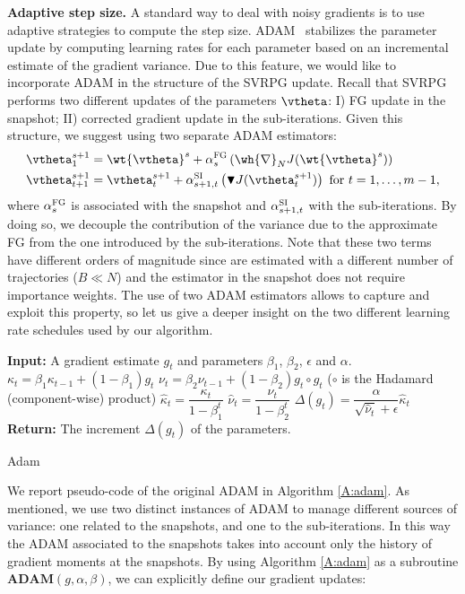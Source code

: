\textbf{Adaptive step size.}
A standard way to deal with noisy gradients is to use adaptive strategies to compute the step size.
 \ac{ADAM}~\citep{kingma2014adam} stabilizes the parameter update by computing learning rates for each parameter based on an incremental estimate of the gradient variance.
Due to this feature, we would like to incorporate \acs{ADAM} in the structure of the \acs{SVRPG} update.
Recall that \acs{SVRPG} performs two different updates of the parameters $\vtheta$: I) \acs{FG} update in the snapshot; II) corrected gradient update in the sub-iterations.
Given this structure, we suggest using two separate \acs{ADAM} estimators:
\begin{align*}
\vtheta^{s+1}_1 &= \wt{\vtheta}^s + \alpha^{\textsc{FG}}_s\left(\wh{\nabla}_N J(\wt{\vtheta}^s) \right)\\
\vtheta^{s+1}_{t+1} &= \vtheta^{s+1}_t + \alpha^{\textsc{SI}}_{s+1,t}\left( 
\blacktriangledown J(\vtheta^{s+1}_t)\right)
\text{ for $t=1,\dots,m-1$},
\end{align*}
where $\alpha^{\textsc{FG}}_{s}$ is associated with the snapshot and $\alpha^{\textsc{SI}}_{s+1,t}$ with the sub-iterations.
By doing so, we decouple the contribution of the variance due to the approximate \acs{FG} from the one introduced by the sub-iterations.
Note that these two terms have different orders of magnitude since are estimated with a different number of trajectories ($B \ll N$) and the estimator in the snapshot does not require importance weights.
The use of two \acs{ADAM} estimators allows to capture and exploit this property, so let us give a deeper insight on the two different learning rate schedules used by our algorithm.\newline
\begin{algorithm}[h]
	\begin{algorithmic}
		\STATE \textbf{Input:} A gradient estimate $g_t$ and parameters $\beta_1$, $\beta_2$, $\epsilon$ and $\alpha$.
		\STATE $\kappa_t = \beta_1 \kappa_{t-1} + (1 - \beta_1) g_t$
		\STATE $\nu_t = \beta_2 \nu_{t-1} + (1 - \beta_2) g_t \circ g_t$ ($\circ$ is the Hadamard (component-wise) product)
		\STATE $\hat{\kappa}_t = \dfrac{\kappa_t}{1 - \beta^t_1}$
		\STATE $\hat{\nu}_t = \dfrac{\nu_t}{1 - \beta^t_2}$
		\STATE $\Delta(g_t) = \dfrac{\alpha}{\sqrt{\hat{\nu}_t} + \epsilon} \hat{\kappa}_t$
		\STATE \textbf{Return:} The increment $\Delta(g_t)$  of the parameters.
	\end{algorithmic}
	\caption{
		\label{A:adam}
		Adam}
\end{algorithm}
We report pseudo-code of the original \acs{ADAM} \citep{kingma2014adam} in Algorithm \ref{A:adam}. As mentioned, we use two distinct instances of \acs{ADAM} to manage different sources of variance: one related to the snapshots, and one to the sub-iterations. In this way the \acs{ADAM} associated to the snapshots takes into account only the history of gradient moments at the snapshots. By using Algorithm \ref{A:adam} as a subroutine $\textbf{ADAM}(g,\alpha,\beta)$, we can explicitly define our gradient updates:

